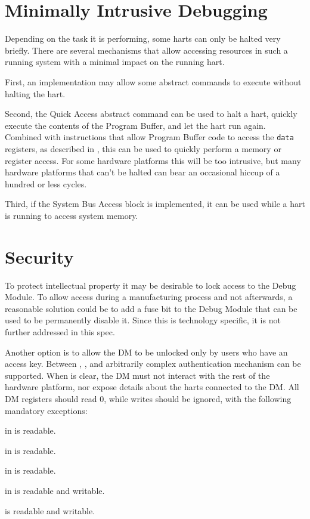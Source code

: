 \section{Minimally Intrusive Debugging}

Depending on the task it is performing, some harts can only be halted very briefly.
There are several mechanisms that allow accessing resources in such a running system
with a minimal impact on the running hart.

First, an implementation may allow some abstract commands to execute without halting the hart.

Second, the Quick Access abstract command can be used to halt a hart, quickly
execute the contents of the Program Buffer, and let the hart run again.
Combined with instructions that allow Program Buffer code to access the
{\tt data} registers, as described in \RdmHartinfo, this can be used to quickly
perform a memory or register access. For some hardware platforms this will be too
intrusive, but many hardware platforms that can't be halted can bear an occasional hiccup
of a hundred or less cycles.

Third, if the System Bus Access block is implemented, it can be used while a
hart is running to access system memory.

\section{Security}

To protect intellectual property it may be desirable to lock access to the
Debug Module.  To allow access during a manufacturing process and not
afterwards, a reasonable solution could be to add a fuse bit to the Debug
Module that can be used to be permanently disable it. Since this is technology
specific, it is not further addressed in this spec.

Another option is to allow the DM to be unlocked only by users who have an
access key. Between \FdmDmstatusAuthenticated, \FdmDmstatusAuthbusy, and \RdmAuthdata arbitrarily
complex authentication mechanism can be supported.  When \FdmDmstatusAuthenticated is
clear, the DM must not interact with the rest of the hardware platform, nor expose
details about the harts connected to the DM. All DM registers should read 0,
while writes should be ignored, with the following mandatory exceptions:
\begin{steps}{}
    \item \FdmDmstatusAuthenticated in \RdmDmstatus is readable.
    \item \FdmDmstatusAuthbusy in \RdmDmstatus is readable.
    \item \FdmDmstatusVersion in \RdmDmstatus is readable.
    \item \FdmDmcontrolDmactive in \RdmDmcontrol is readable and writable.
    \item \RdmAuthdata is readable and writable.
\end{steps}

